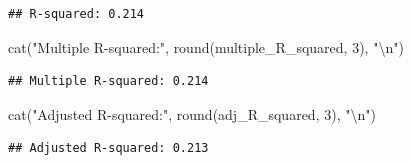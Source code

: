 \documentclass[
]{article}
\newenvironment{Shaded}{\begin{snugshade}}{\end{snugshade}}
\newcommand{\DecValTok}[1]{\textcolor[rgb]{0.00,0.00,0.81}{#1}}
\newcommand{\FunctionTok}[1]{\textcolor[rgb]{0.00,0.00,0.00}{#1}}
\newcommand{\NormalTok}[1]{#1}
\newcommand{\SpecialCharTok}[1]{\textcolor[rgb]{0.00,0.00,0.00}{#1}}
\newcommand{\StringTok}[1]{\textcolor[rgb]{0.31,0.60,0.02}{#1}}
\begin{document}
\begin{verbatim}
## R-squared: 0.214
\end{verbatim}

\begin{Shaded}
\begin{Highlighting}[]
\FunctionTok{cat}\NormalTok{(}\StringTok{"Multiple R{-}squared:"}\NormalTok{, }\FunctionTok{round}\NormalTok{(multiple\_R\_squared, }\DecValTok{3}\NormalTok{), }\StringTok{"}\SpecialCharTok{\textbackslash{}n}\StringTok{"}\NormalTok{)}
\end{Highlighting}
\end{Shaded}

\begin{verbatim}
## Multiple R-squared: 0.214
\end{verbatim}

\begin{Shaded}
\begin{Highlighting}[]
\FunctionTok{cat}\NormalTok{(}\StringTok{"Adjusted R{-}squared:"}\NormalTok{, }\FunctionTok{round}\NormalTok{(adj\_R\_squared, }\DecValTok{3}\NormalTok{), }\StringTok{"}\SpecialCharTok{\textbackslash{}n}\StringTok{"}\NormalTok{)}
\end{Highlighting}
\end{Shaded}

\begin{verbatim}
## Adjusted R-squared: 0.213
\end{verbatim}
\end{document}
